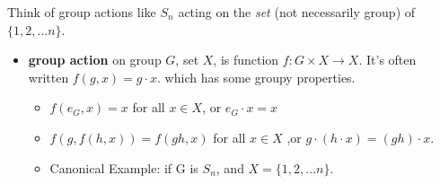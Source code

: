\documentclass[11pt, oneside]{article}   	%
\begin{document}
Think of group actions like $S_n$ acting on the \emph{set} (not necessarily group)  of $\{1, 2, ... n\}$.
\begin{itemize}
\item \textbf{group action} on group $G$, set $X$, is function $f: G \times X \rightarrow X$.  It's often written $f(g,x) = g \cdot x$. which has some groupy properties.
  \begin{itemize}
  \item $f(e_G, x) = x$ for all $x \in X$, or $e_G \cdot x = x$
  \item $f(g, f(h, x)) = f(gh, x)$ for all $x \in X$ ,or $g \cdot (h \cdot x) = (gh) \cdot x$.
  \item Canonical Example: if G is $S_n$, and $X = \{1, 2, ... n\}$.  
  \end{itemize}


\end{itemize}
\end{document}
